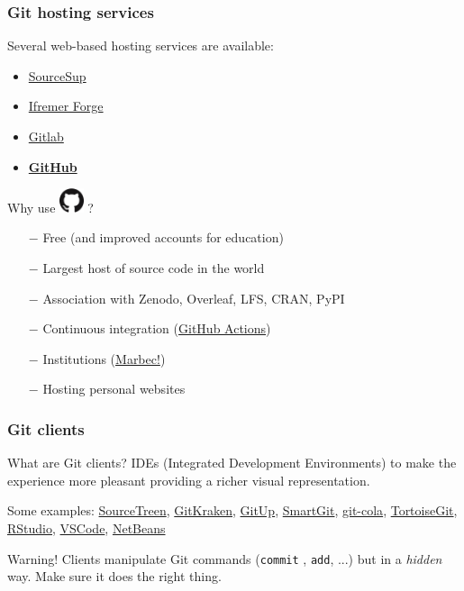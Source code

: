 \documentclass[svgnames]{beamer}
\begin{document}
\begin{frame}
\frametitle{Git hosting services}

Several web-based hosting services are available:

\begin{itemize}
\item \href{https://sourcesup.renater.fr/}{SourceSup}
\item \href{https://forge.ifremer.fr/}{Ifremer Forge}
\item \href{https://gitlab.com/}{Gitlab}
\item \textbf{\href{https://github.com/}{GitHub}}
\end{itemize}

Why use \includegraphics[height=20pt]{img/GitHub-Mark-120px-plus.png}  ?
\begin{itemize}
\item[$-$]{Free (and improved accounts for education)}
\item[$-$]{Largest host of source code in the world}
\item[$-$]{Association with Zenodo, Overleaf, LFS, CRAN, PyPI}
\item[$-$]{Continuous integration (\href{https://github.com/features/actions}{GitHub Actions})}
\item[$-$]{Institutions (\href{https://github.com/umr-marbec}{Marbec!})}
\item[$-$]{Hosting personal websites}
\end{itemize}

\end{frame}

\begin{frame}[fragile]
    \frametitle{Git clients}

	\begin{block}{What are Git clients?}
    IDEs (Integrated Development Environments) to make the experience more pleasant providing a richer visual representation.\\
    \end{block}
    \hfill

Some examples:
\href{https://www.sourcetreeapp.com/}{SourceTreen}, 
\href{https://www.gitkraken.com/}{GitKraken},
\href{https://gitup.co/}{GitUp},
\href{https://www.syntevo.com/smartgit/}{SmartGit}, 
\href{https://git-cola.github.io/}{git-cola}, 
\href{https://tortoisegit.org/}{TortoiseGit},
\href{https://www.rstudio.com/}{RStudio},
\href{https://code.visualstudio.com/}{VSCode},
\href{https://netbeans.apache.org/}{NetBeans}\\

\hfill

\begin{alertblock}{Warning!}
Clients manipulate Git commands (\verb+commit+ , \verb+add+, ...) but in a \emph{hidden} way. 
Make sure it does the right thing.
\end{alertblock}

\end{frame}
\end{document}
